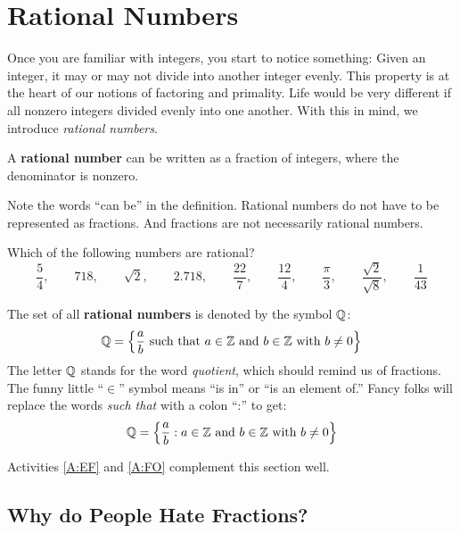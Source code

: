 \section{Rational Numbers}


Once you are familiar with integers, you start to notice something:
Given an integer, it may or may not divide into another integer
evenly. This property is at the heart of our notions of factoring and
primality. Life would be very different if all nonzero integers
divided evenly into one another. With this in mind, we introduce
\textit{rational numbers}.

\begin{definition} 
A \textbf{rational number} can be written as a fraction of
integers, where the denominator is nonzero.
\end{definition}

\begin{warning}
Note the words ``can be'' in the definition.  Rational numbers do not have to be represented as fractions.  And fractions are not necessarily rational numbers.  
\end{warning}

\begin{question}
Which of the following numbers are rational?
$$\frac{5}{4}, \qquad 718, \qquad \sqrt{2}, \qquad 2.718, \qquad \frac{22}{7}, \qquad \frac{12}{4}, \qquad \frac{\pi}{3}, \qquad \frac{\sqrt{2}}{\sqrt{8}}, \qquad \frac{1}{43}$$
\end{question}

The set of all \textbf{rational numbers} is denoted by the symbol $\mathbb Q$:
\[
      \Q = \left\{\frac{a}{b}\text{ such that $a\in\Z$ and $b\in\Z$ with $b\ne 0$}\right\}\index{Q@$\Q$}\index{e@$\in$}
\]
The letter $\mathbb Q$ stands for the word \textit{quotient}, which should remind us of
fractions.   The funny little ``$\in$'' symbol means ``is in'' or ``is an element of.'' Fancy folks will replace the words \textit{such that} with a colon
``:'' to get:
\[
 \mathbb Q = \left\{\frac{a}{b}:\text{$a\in\mathbb Z$ and $b\in\mathbb Z$ with $b\ne 0$}\right\}
\]

\begin{activitynote}
Activities \ref{A:EF} and \ref{A:FO} complement this section well.  
\end{activitynote}


\subsection{Why do People Hate Fractions?}

